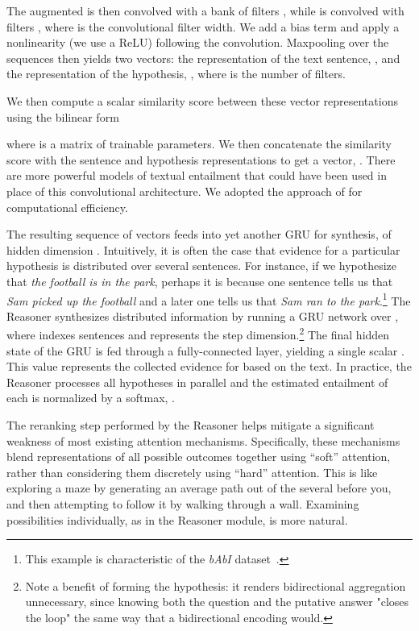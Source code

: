 \documentclass[11pt,letterpaper]{article}
\begin{document}
The augmented  is then convolved with a bank of filters , while  is convolved with filters , where  is the convolutional filter width. We add a bias term and apply a nonlinearity (we use a ReLU) following the convolution. Maxpooling over the sequences then yields two vectors: the representation of the text sentence, , and the representation of the hypothesis, , where  is the number of filters.

We then compute a scalar similarity score between these vector representations using the bilinear form

where  is a matrix of trainable parameters. We then concatenate the similarity score with the sentence and hypothesis representations to get a vector, . There are more powerful models of textual entailment that could have been used in place of this convolutional architecture. We adopted the approach of  for computational efficiency.

The resulting sequence of  vectors feeds into yet another GRU for synthesis, of hidden dimension . Intuitively, it is often the case that evidence for a particular hypothesis is distributed over several sentences. For instance, if we hypothesize that \textsl{the football is in the park}, perhaps it is because one sentence tells us that \textsl{Sam picked up the football} and a later one tells us that \textsl{Sam ran to the park}.\footnote{This example is characteristic of the {\it bAbI} dataset~\cite{weston2015}.} The Reasoner synthesizes distributed information by running a GRU network over , where  indexes sentences and represents the step dimension.\footnote{Note a benefit of forming the hypothesis: it renders bidirectional aggregation unnecessary, since knowing both the question and the putative answer "closes the loop" the same way that a bidirectional encoding would.} The final hidden state of the GRU is fed through a fully-connected layer, yielding a single scalar . This value represents the collected evidence for  based on the text. In practice, the Reasoner processes all  hypotheses in parallel and the estimated entailment of each is normalized by a softmax, .

The reranking step performed by the Reasoner helps mitigate a significant weakness of most existing attention mechanisms. Specifically, these mechanisms blend representations of all possible outcomes together using ``soft'' attention, rather than considering them discretely using ``hard'' attention. This is like exploring a maze by generating an average path out of the several before you, and then attempting to follow it by walking through a wall. Examining possibilities individually, as in the Reasoner module, is more natural.
\end{document}
